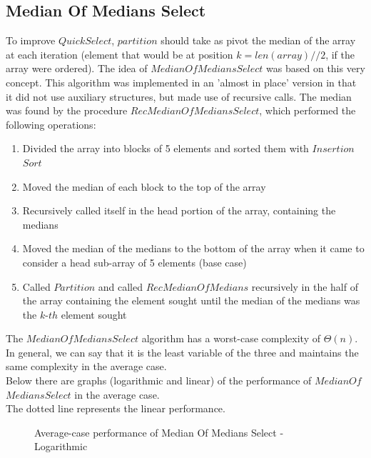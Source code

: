 \documentclass{article}
\begin{document}
\subsection{Median Of Medians Select}
To improve $QuickSelect$, $partition$ should take as pivot the median of the array at each iteration (element that would be at position $k=len(array)//2$, if the array were ordered).
The idea of $MedianOfMediansSelect$ was based on this very concept.
This algorithm was implemented in an 'almost in place' version in that it did not use auxiliary structures, but made use of recursive calls.
The median was found by the procedure $RecMedianOfMediansSelect$, which performed the following operations:
\begin{enumerate}
    \item Divided the array into blocks of 5 elements and sorted them with $Insertion$ $Sort$
    \item Moved the median of each block to the top of the array
    \item Recursively called itself in the head portion of the array, containing the medians
    \item Moved the median of the medians to the bottom of the array when it came to consider a head sub-array of 5 elements (base case)
    \item Called $Partition$ and called $RecMedianOfMedians$ recursively in the half of the array containing the element sought until the median of the medians was the $k$-$th$ element sought
\end{enumerate}
The $MedianOfMediansSelect$ algorithm has a worst-case complexity of $\Theta(n)$.
In general, we can say that it is the least variable of the three and maintains the same complexity in the average case.\\
Below there are graphs (logarithmic and linear) of the performance of $MedianOf$ $MediansSelect$ in the average case. \\
The dotted line represents the linear performance.\\

\begin{figure}[H]   %
  \caption{Average-case performance of Median Of Medians Select - Logarithmic}
\end{figure}
\end{document}
